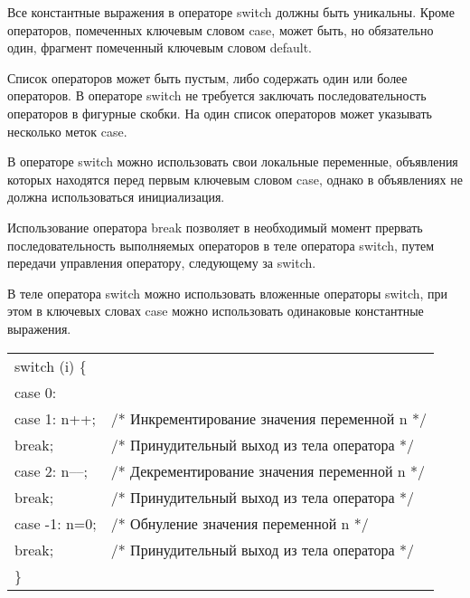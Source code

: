 Все константные выражения в операторе switch должны быть уникальны. Кроме операторов, помеченных ключевым словом case, может быть, но обязательно один, фрагмент помеченный ключевым словом default. \killoverfullbefore

Список операторов может быть пустым, либо содержать один или более операторов. В операторе switch не требуется заключать последовательность операторов в фигурные скобки. На один список операторов может указывать несколько меток case. \killoverfullbefore

В операторе switch можно использовать свои локальные переменные, объявления которых находятся перед первым ключевым словом case, однако в объявлениях не должна использоваться инициализация. \killoverfullbefore

Использование оператора break позволяет в необходимый момент прервать последовательность выполняемых операторов в теле оператора switch, путем передачи управления оператору, следующему за switch.  \killoverfullbefore

В теле оператора switch можно использовать вложенные операторы switch, при этом в ключевых словах case можно использовать одинаковые константные выражения. \killoverfullbefore \BL

\begin{pExample}
\begin{tabular}{ l l }
 switch (i) \{ & \textcolor{exComm}{} \\
\indent case 0: & \textcolor{exComm}{} \\
\indent case 1: n++;  & \textcolor{exComm}{/* Инкрементирование значения переменной n */} \\
\indent \indent break; & \textcolor{exComm}{/* Принудительный выход из тела оператора */} \\
\indent case 2: n{--}{--};  & \textcolor{exComm}{/* Декрементирование значения переменной n */} \\
\indent \indent break; & \textcolor{exComm}{/* Принудительный выход из тела оператора  */} \\
\indent case -1: n=0;  & \textcolor{exComm}{/* Обнуление значения переменной n */} \\
\indent \indent break; & \textcolor{exComm}{/* Принудительный выход из тела оператора  */} \\
\} & \textcolor{exComm}{} \\
\end{tabular}
\end{pExample}

